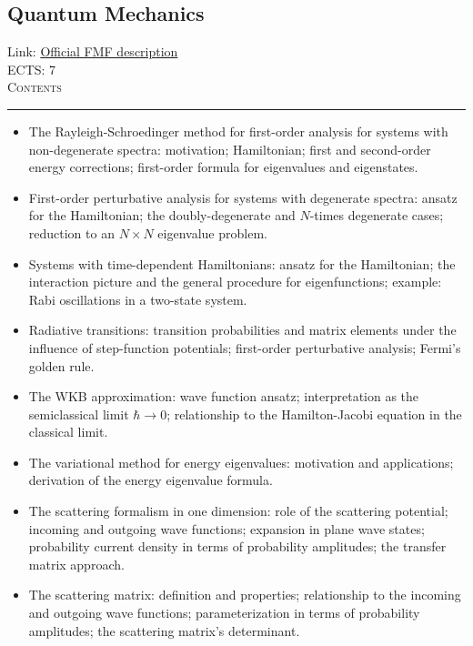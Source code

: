 \documentclass[11pt, a4paper]{article}
\newenvironment{course}[3]{
\subsection{#1}%
Link: \href{#2}{Official FMF description}\\%
ECTS: #3%
\vspace{1ex}
\\
{\large \textsc{Contents}}\\[-0.9ex]%
\rule{\textwidth}{0.5pt}
\vspace{-3ex}
}
{}
\newenvironment{chapter}[1]{
\begin{tcolorbox}[title=#1, breakable]
}
{\end{tcolorbox}}
\begin{document}
\begin{course}{Quantum Mechanics}{https://www.fmf.uni-lj.si/en/study-physics/programmes/1fiz/2020/7000777/courses/1156/}{7}
\begin{chapter}{Perturbation and approximation theory}
\begin{itemize}
            \item The Rayleigh-Schroedinger method for first-order analysis for systems with non-degenerate spectra: motivation; Hamiltonian; first and second-order energy corrections; first-order formula for eigenvalues and eigenstates.

            \item First-order perturbative analysis for systems with degenerate spectra: ansatz for the Hamiltonian; the doubly-degenerate and $ N $-times degenerate cases; reduction to an $ N \times N $ eigenvalue problem.

            \item Systems with time-dependent Hamiltonians: ansatz for the Hamiltonian; the interaction picture and the general procedure for eigenfunctions; example: Rabi oscillations in a two-state system.

            \item Radiative transitions: transition probabilities and matrix elements under the influence of step-function potentials; first-order perturbative analysis; Fermi's golden rule.

            \item The WKB approximation: wave function ansatz; interpretation as the semiclassical limit $ \hbar \to 0 $; relationship to the Hamilton-Jacobi equation in the classical limit.

            \item The variational method for energy eigenvalues: motivation and applications; derivation of the energy eigenvalue formula.
        
        \end{itemize}
    \end{chapter}

    \begin{chapter}{Introduction to scattering}
        \begin{itemize}
        
            \item The scattering formalism in one dimension: role of the scattering potential; incoming and outgoing wave functions; expansion in plane wave states; probability current density in terms of probability amplitudes; the transfer matrix approach.

            \item The scattering matrix: definition and properties; relationship to the incoming and outgoing wave functions; parameterization in terms of probability amplitudes; the scattering matrix's determinant.


\end{itemize}
\end{chapter}
\end{course}
\end{document}
